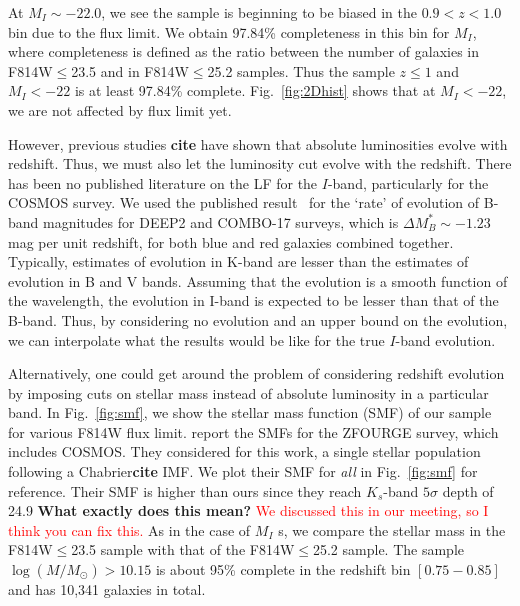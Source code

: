 \documentclass[twocolumn,useAMS,usenatbib]{mn2e}
\newcommand{\rachel}[1]{{\textcolor{red}{#1}}}
\begin{document}
At $M_I\sim-22.0$, we see the sample is beginning to be biased in the $0.9<z<1.0$ bin due to the flux limit. We obtain 97.84\% completeness in this bin for $M_I$, where completeness is defined as the ratio between the number of galaxies in F814W$\le$23.5 and in F814W$\le$25.2 samples.
Thus the sample $z\le1$ and $M_I<-22$ is at least 97.84\% complete. Fig.~\ref{fig:2Dhist} shows that at $M_I<-22$, we are not affected by flux limit yet. 

However, previous studies {\bf cite} have shown that absolute luminosities evolve with redshift. Thus, we must also let the luminosity cut evolve with the redshift. 
There has been no published literature on the LF for the $I$-band, particularly for the COSMOS survey.
We used the published result~\citep{Faber2007} for the `rate' of evolution of B-band magnitudes for DEEP2 and COMBO-17 surveys, which is $ \Delta M_B^* \sim -1.23$ mag per unit redshift, for both blue and red galaxies combined together.
Typically, estimates of evolution in K-band are lesser than the estimates of evolution in B and V bands.
Assuming that the evolution is a smooth function of the wavelength, the evolution in I-band is expected to be lesser than that of the B-band. 
Thus, by considering no evolution and an upper bound on the evolution, we can interpolate what the results would be like for the true $I$-band evolution.



Alternatively, one could get around the problem of considering redshift evolution by imposing cuts on stellar mass instead of absolute luminosity in a particular band. In Fig.~\ref{fig:smf}, we show the stellar mass function (SMF) of our sample for various F814W flux limit.
\cite{Tomczak_SMF} report the SMFs for the ZFOURGE survey, which includes COSMOS. They considered for this work, a single stellar population following a Chabrier{\bf cite} IMF. 
We plot their SMF for \emph{all} in Fig.~\ref{fig:smf} for
reference. Their SMF is higher than ours since they reach $K_s$-band
$5\sigma$ depth of 24.9 {\bf What exactly does this mean?}
\rachel{We discussed this in our meeting, so I think you can fix this.}
As in the case of $M_I$ s, we compare the stellar mass in the F814W$\le$23.5 sample with that of the F814W$\le$25.2 sample. 
The sample $\log(M/M_\odot) > 10.15$ is about 95\% complete in the redshift bin $\left[ 0.75 - 0.85\right]$ and has 10,341 galaxies in total.
\end{document}
